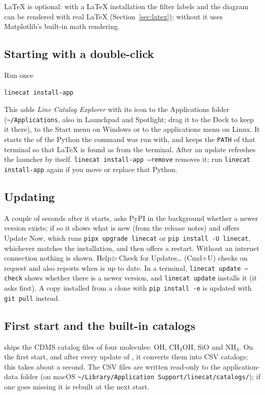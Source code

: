 \documentclass[11pt]{article}
\newcommand{\menu}[1]{\textsf{#1}}
\newcommand{\key}[1]{\textsf{#1}}
\newcommand{\then}{\,$\triangleright$\,}
\begin{document}
\LaTeX{} is optional: with a \LaTeX{} installation the filter labels and the diagram can be
rendered with real \LaTeX{} (Section~\ref{sec:latex}); without it \AppName{} uses Matplotlib's
built-in math rendering.

\subsection{Starting with a double-click}
Run once
\begin{verbatim}
linecat install-app
\end{verbatim}
This adds \emph{Line Catalog Explorer} with its icon to the Applications folder
(\texttt{\textasciitilde/Applications}, also in Launchpad and Spotlight; drag it to the Dock to keep
it there), to the Start menu on Windows or to the applications menu on Linux. It starts the
\AppName{} of the Python the command was run with, and keeps the \texttt{PATH} of that terminal so
that \LaTeX{} is found as from the terminal. After an update \AppName{} refreshes the launcher by
itself. \texttt{linecat install-app --remove} removes it; run \texttt{linecat install-app} again
if you move or replace that Python.

\subsection{Updating}
A couple of seconds after it starts, \AppName{} asks PyPI in the background whether a newer
version exists; if so it shows what is new (from the release notes) and offers
\menu{Update Now}, which runs \texttt{pipx upgrade linecat} or \texttt{pip install -U linecat},
whichever matches the installation, and then offers a restart. Without an internet connection
nothing is shown. \menu{Help\then Check for Updates\dots} (\key{Cmd+U}) checks on request and also reports when
\AppName{} is up to date. In a terminal, \texttt{linecat update --check} shows whether there is a
newer version, and \texttt{linecat update} installs it (it asks first). A copy installed from a
clone with \texttt{pip install -e} is updated with \texttt{git pull} instead.

\subsection{First start and the built-in catalogs}
\AppName{} ships the CDMS catalog files of four molecules: OH, CH$_3$OH, SiO and NH$_3$. On the
first start, and after every update of \AppName{}, it converts them into CSV catalogs; this takes
about a second. The CSV files are written read-only to the application-data folder
(on macOS \texttt{\textasciitilde/Library/Application Support/linecat/catalogs/}); if one goes
missing it is rebuilt at the next start.
\end{document}

